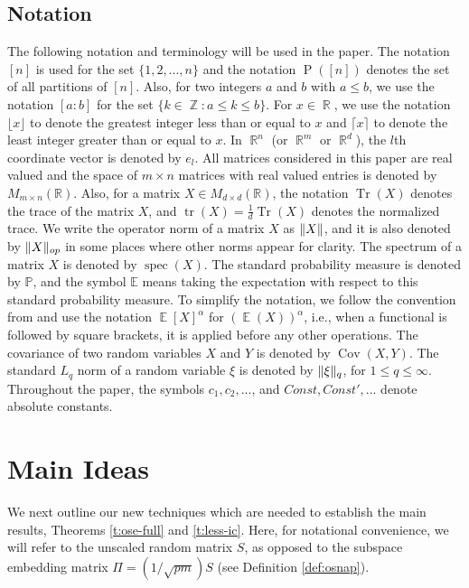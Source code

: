\documentclass[11pt]{amsart}
\numberwithin{equation}{section}
\numberwithin{equation}{section}
\DeclareMathOperator{\E}{\mathbb{E}}
\DeclareMathOperator{\R}{\mathbb{R}}
\DeclareMathOperator{\Z}{\mathbb{Z}}
\DeclareMathOperator*{\tr}{tr}
\DeclareMathOperator*{\Tr}{Tr}
\DeclareMathOperator{\cov}{Cov}
\DeclareMathOperator{\spec}{spec}
\DeclarePairedDelimiter{\norm}{\lVert}{\rVert}
\theoremstyle{remark}
\theoremstyle{definition}
\begin{document}
\subsection{Notation}
The following notation and terminology will be used in the paper. The notation $[n]$ is used for the set $\{1,2,...,n\}$ and the notation $\operatorname{P}([n])$ denotes the set of all partitions of $[n]$. Also, for two integers $a$ and $b$ with $a \le b$, we use the notation $[a:b]$ for the set $\{k \in \Z:a \le k \le b\}$. For $x \in \R$, we use the notation $\lfloor x \rfloor$ to denote the greatest integer less than or equal to $x$ and $\lceil x \rceil$ to denote the least integer greater than or equal to  $x$. In $\R^n$ (or $\R^m$ or $\R^d$), the $l$th coordinate vector is denoted by $e_l$. All matrices considered in this paper are real valued and the space of $m \times n$ matrices with real valued entries is denoted by $M_{m \times n}(\mathbb{R})$. Also, for a matrix $X \in M_{d \times d}(\mathbb{R})$, the notation $\Tr (X)$ denotes the trace of the matrix $X$, and $\tr (X) = \frac{1}{d} \Tr (X)$ denotes the normalized trace. We write the operator norm of a matrix $X$ as $\norm{X}$, and it is also denoted by $\norm{X}_{op}$ in some places where other norms appear for clarity. The spectrum of a matrix $X$ is denoted by $\spec(X)$.  The standard probability measure is denoted by $\mathbb{P}$, and the symbol $\mathbb{E}$ means taking the expectation with respect to this standard probability measure. To simplify the notation, we follow the convention from \cite{brailovskaya2022universality} and use the notation $\E [X]^{\alpha}$ for $(\E(X))^{\alpha}$, i.e., when a functional is followed by square brackets, it is applied before any other operations. The covariance of two random variables $X$ and $Y$ is denoted by $\cov(X,Y)$. The standard $L_q$ norm of a random variable $\xi$ is denoted by $\norm{\xi}_q$, for $1 \le q \le \infty$. Throughout the paper, the symbols $c_1, c_2, ...$, and $Const, Const', ...$ denote absolute constants. 



 \section{Main Ideas}
\label{s:overview}


We next outline our new techniques which are needed to establish the main results, Theorems \ref{t:ose-full} and \ref{t:less-ic}. Here, for notational convenience, we will refer to the unscaled random matrix $S$, as opposed to the subspace embedding matrix $\Pi=(1/\sqrt{pm})S$ (see Definition \ref{def:osnap}).
\end{document}
